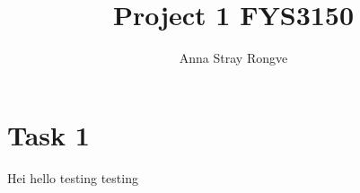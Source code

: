 \documentclass{article}
\title{Project 1 FYS3150}\vspace{-3ex}
\author{Anna Stray Rongve}
\date{\vspace{-5ex}}
\begin{document}
\maketitle

\section*{Task 1}

Hei hello  testing testing 
\end{document}

